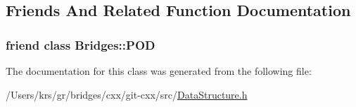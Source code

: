 \subsection{Friends And Related Function Documentation}
\hypertarget{classbridges_1_1_data_structure_a7f3c8f8f2dfc557bebb6fda1ec6e8ae0}{}
\subsubsection[{Bridges\+::\+P\+O\+D}]{\setlength{\rightskip}{0pt plus 5cm}friend class {\bf Bridges\+::\+P\+O\+D}\hspace{0.3cm}{\ttfamily [friend]}}\label{classbridges_1_1_data_structure_a7f3c8f8f2dfc557bebb6fda1ec6e8ae0}


The documentation for this class was generated from the following file\+:\begin{DoxyCompactItemize}
\item 
/\+Users/krs/gr/bridges/cxx/git-\/cxx/src/\hyperlink{_data_structure_8h}{Data\+Structure.\+h}\end{DoxyCompactItemize}
